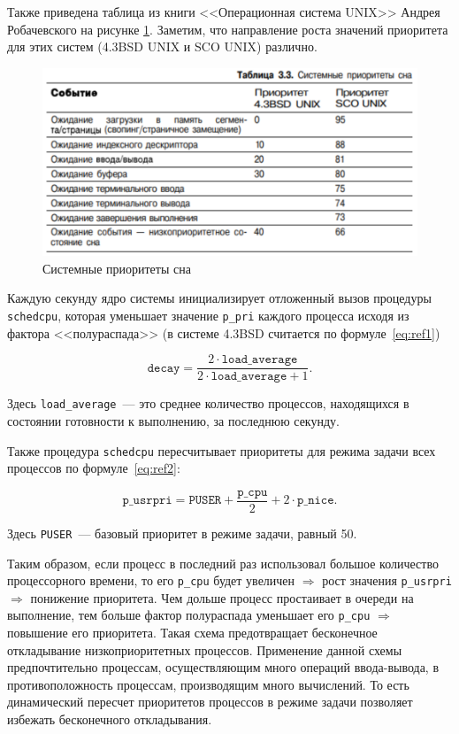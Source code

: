 \documentclass[14pt]{extarticle}
\begin{document}
Также приведена таблица из книги <<Операционная система UNIX>> Андрея
Робачевского на рисунке \ref{fig:rob}. Заметим, что направление роста значений
приоритета для этих систем (4.3BSD UNIX и SCO UNIX) различно.

\begin{figure}[h]
    \centering
    \includegraphics[width=0.90\linewidth]{resources/sleep.png}
    \caption{Системные приоритеты сна}
    \label{fig:rob}
\end{figure}

Каждую секунду ядро системы инициализирует отложенный вызов процедуры
\texttt{schedcpu}, которая уменьшает значение \texttt{p\_pri} каждого процесса
исходя из фактора <<полураспада>> (в системе 4.3BSD считается по
формуле~\ref{eq:ref1})

\begin{equation}
    \label{eq:ref1}
    \mathtt{decay} = \frac{2 \cdot \mathtt{load\_average}}{2 \cdot
    \mathtt{load\_average} + 1}.
\end{equation}

Здесь \texttt{load\_average}~--- это среднее количество процессов, находящихся
в состоянии готовности к выполнению, за последнюю секунду.

Также процедура \texttt{schedcpu} пересчитывает приоритеты для режима задачи
всех процессов по формуле~\ref{eq:ref2}:

\begin{equation}
    \label{eq:ref2}
    \mathtt{p\_usrpri} = \mathtt{PUSER} + \frac{\mathtt{p\_cpu}}{2} + 2 \cdot
    \mathtt{p\_nice}.
\end{equation}

Здесь \texttt{PUSER}~--- базовый приоритет в режиме задачи, равный 50.

Таким образом, если процесс в последний раз использовал большое количество
процессорного времени, то его \texttt{р\_срu} будет увеличен \( \Rightarrow \)
рост значения \texttt{p\_usrpri} \( \Rightarrow \) понижение приоритета. Чем
дольше процесс простаивает в очереди на выполнение, тем больше фактор
полураспада уменьшает его \texttt{р\_срu} \( \Rightarrow \) повышение его
приоритета. Такая схема предотвращает бесконечное откладывание
низкоприоритетных процессов. Применение данной схемы предпочтительно процессам,
осуществляющим много операций ввода-вывода, в противоположность процессам,
производящим много вычислений. То есть динамический пересчет приоритетов
процессов в режиме задачи позволяет избежать бесконечного откладывания.
\end{document}

